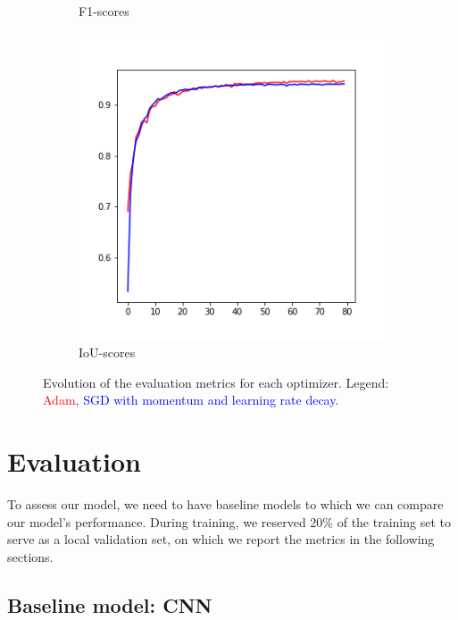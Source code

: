 \documentclass[10pt,conference,compsocconf]{IEEEtran}
\begin{document}
\begin{figure}[ht]
\begin{subfigure}{0.31\linewidth}
        \caption{F1-scores}
    \end{subfigure}
    \begin{subfigure}{0.31\linewidth}
        \centering
        \includegraphics[width=\linewidth]{doc/images/opt_iou_scores.png}
        \caption{IoU-scores}
    \end{subfigure}
    \caption{Evolution of the evaluation metrics for each optimizer. Legend: \textcolor{red}{Adam}, \textcolor{blue}{SGD with momentum and learning rate decay}.}
    \label{fig:opt_metrics}
\end{figure}

\section{Evaluation}

To assess our model, we need to have baseline models to which we can compare our model's performance. During training, we reserved 20\% of the training set to serve as a local validation set, on which we report the metrics in the following sections.

\subsection{Baseline model: CNN}
\end{document}
